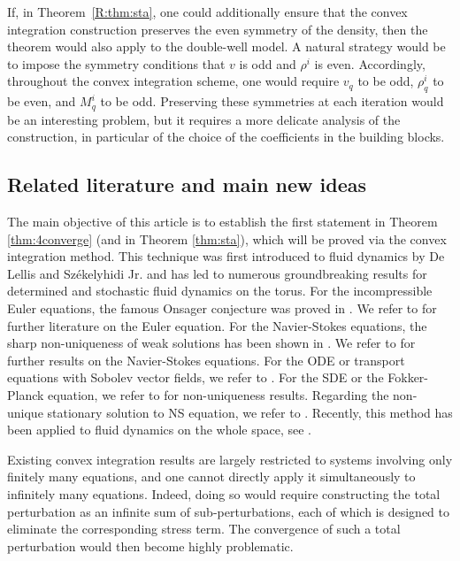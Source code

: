 \documentclass[10pt,a4paper]{amsart}
\numberwithin{equation}{section}
\begin{document}
If, in Theorem~\ref{R:thm:sta}, one could additionally ensure that the convex
integration construction preserves the even symmetry of the density, then the
theorem would also apply to the  double-well
model. A natural strategy would be to impose the symmetry conditions that
$v$ is odd and $\rho^i$ is even. Accordingly, throughout the convex integration
scheme, one would require
$
v_q$  to be odd,
$\rho_q^i$  to be even, and
$M_q^i$ to be odd.
Preserving these symmetries at each iteration would be an interesting problem,
but it requires a more delicate analysis of the construction, in particular of
the choice of the coefficients in the building blocks.
 

\subsection{Related literature and main new ideas}

The main objective of this article is to establish the first statement in Theorem \ref{thm:4converge} (and in Theorem \ref{thm:sta}), which will be proved via the convex integration method.  
This technique was first introduced to fluid dynamics by De Lellis and Sz\'ekelyhidi Jr. \cite{DLS09, DLS10, DLS13} and  has  led to numerous groundbreaking results for determined and stochastic fluid dynamics on the torus. For the incompressible Euler equations, the famous Onsager conjecture was proved in \cite{Ise18,BDLSV19}. We refer to \cite{TCP,DSJ17,BFH20,NV23,GKN23,GR24} for further literature on the Euler equation. For the Navier-Stokes equations, the sharp non-uniqueness of weak solutions has been shown in \cite{BVb,BCV18,CL22,CL23}.  We refer to \cite{BV,HZZ21b,HZZ19,HZZ22,LZ23b,LZ24} for further results on the Navier-Stokes equations.   
For the ODE or transport equations with Sobolev vector fields, we refer to \cite{CGSW15,MS18,MS19,MS20,BCDL21,CL21,PS23}. 
For the SDE or the Fokker-Planck equation, we refer to \cite{LRZ25,LR25} for non-uniqueness results.  Regarding the non-unique stationary solution to NS equation, we refer to \cite{Luo19}.   Recently, this method has been applied to fluid dynamics on the whole space, see \cite{MNY24a,MNY24b,LR25}.

 

 Existing convex integration results are largely restricted to systems involving
only finitely many equations, and  one cannot directly apply it 
simultaneously to infinitely many equations. Indeed, doing so would require
constructing the total perturbation as an infinite sum of sub-perturbations,
each of which is designed to eliminate the corresponding stress term. The
convergence of such a total perturbation would then become highly problematic.
\end{document}
